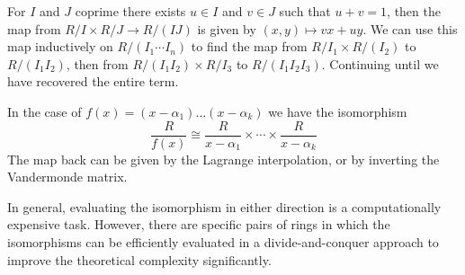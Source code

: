 For $I$ and $J$ coprime there exists $u \in I$ and $v \in J$ such that $u + v = 1$, then the map from $R/I \times R/J \to R/(IJ)$ is given by $(x, y) \mapsto vx + uy$. We can use this map inductively on $R/(I_1\cdots I_n)$ to find the map from $R / I_1 \times R / (I_2)$ to $R / (I_1I_2)$, then from $R / (I_1I_2) \times R / I_3$ to $R / (I_1I_2I_3)$. Continuing until we have recovered the entire term.

In the case of $f(x) = (x - \alpha_1) \ldots (x - \alpha_k)$ we have the isomorphism
\[
    \frac{R}{f(x)} \cong \frac{R}{x - \alpha_1} \times \cdots \times \frac{R}{x - \alpha_k}
\]
The map back can be given by the Lagrange interpolation, or by inverting the Vandermonde matrix.

In general, evaluating the isomorphism in either direction is a computationally expensive task. However, there are specific pairs of rings in which the isomorphisms can be efficiently evaluated in a divide-and-conquer approach to improve the theoretical complexity significantly.
